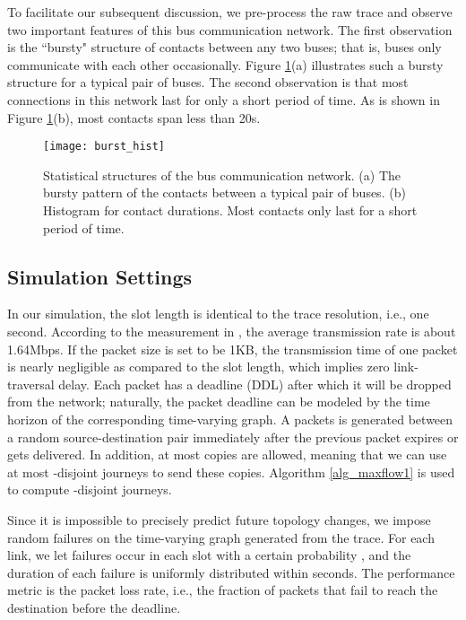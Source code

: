 \documentclass[10pt, conference, letterpaper]{IEEEtran}
\begin{document}
To facilitate our subsequent discussion, we pre-process the raw trace and observe two important features of this bus communication network. The first observation is the ``bursty" structure of contacts between any two buses; that is, buses only communicate with each other occasionally. Figure \ref{trace_stat}(a) illustrates such a bursty structure for a typical pair of buses. The second observation is that most connections in this network last for only a short period of time. As is shown in Figure \ref{trace_stat}(b), most contacts span less than 20s.

\begin{figure}[t]
\begin{center}
\texttt{[image: burst\_hist]}
\caption{Statistical structures of the bus communication network. (a) The bursty pattern of the contacts between a typical pair of buses. (b) Histogram for contact durations. Most contacts only last for a short period of time.}
\label{trace_stat}\vspace{-3mm}
\end{center}
\end{figure}



\subsection{Simulation Settings}
In our simulation, the slot length is identical to the trace resolution, i.e., one second. According to the measurement in \cite{trace}, the average transmission rate is about 1.64Mbps. If the packet size is set to be 1KB, the transmission time of one packet is nearly negligible as compared to the slot length, which implies zero link-traversal delay. Each packet has a deadline (DDL) after which it will be dropped from the network; naturally, the packet deadline can be modeled by the time horizon  of the corresponding time-varying graph.  A packets is generated between a random source-destination pair immediately after the previous packet expires or gets delivered. In addition, at most  copies are allowed, meaning that we can use at most  -disjoint journeys to send these copies.  Algorithm \ref{alg_maxflow1} is used to compute -disjoint journeys.

Since it is impossible to precisely predict future topology changes, we impose random failures on the time-varying graph generated from the trace. For each link, we let failures occur in each slot with a certain probability , and the duration of each failure is uniformly distributed within  seconds. The performance metric is the packet loss rate, i.e., the fraction of packets that fail to reach the destination before the deadline.
\end{document}

